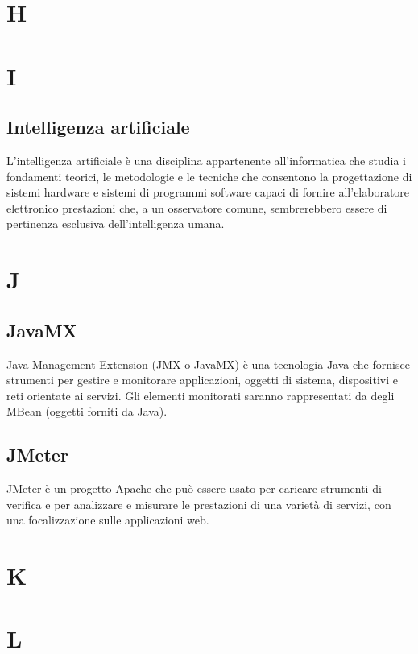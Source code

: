 \clearpage
\section*{H}

\clearpage
\section*{I}
\subsection*{Intelligenza artificiale}
L'intelligenza artificiale è una disciplina appartenente all'informatica che studia i fondamenti teorici, le metodologie e le tecniche che consentono la progettazione di sistemi hardware e sistemi di programmi software capaci di fornire all'elaboratore elettronico prestazioni che, a un osservatore comune, sembrerebbero essere di pertinenza esclusiva dell'intelligenza umana.

\clearpage
\section*{J}

\subsection*{JavaMX}
Java Management Extension (JMX o JavaMX) è una tecnologia Java che fornisce strumenti per gestire e monitorare applicazioni, oggetti di sistema, dispositivi e reti orientate ai servizi. Gli elementi monitorati saranno rappresentati da degli MBean (oggetti forniti da Java).

\subsection*{JMeter}
JMeter è un progetto Apache che può essere usato per caricare strumenti di verifica e per analizzare e misurare le prestazioni di una varietà di servizi, con una focalizzazione sulle applicazioni web.

\clearpage
\section*{K}

\clearpage
\section*{L}

